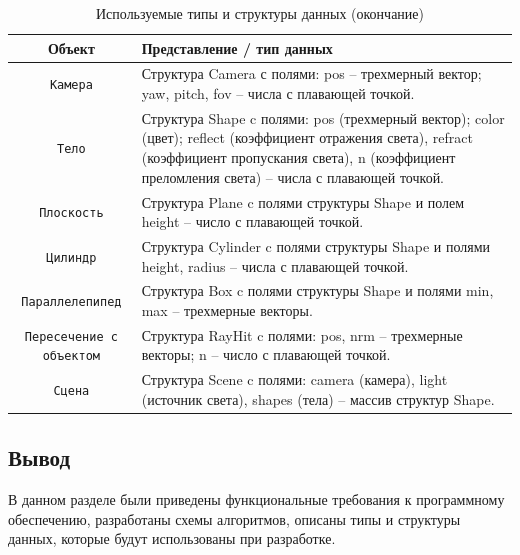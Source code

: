 \newpage
\setcounter{table}{2}
\begin{table}[ht!]
	\centering{}	
	\caption{Используемые типы и структуры данных (окончание)}
	\begin{tabular}{|c|>{\arraybackslash}p{10.5cm}|} \hline
		\textbf{Объект} & \textbf{Представление / тип данных} \\
		\hline\hline
		
		\texttt{Камера} & Структура Camera с полями: pos -- трехмерный вектор; yaw, pitch, fov -- числа с плавающей точкой. \\ \hline
	
		\texttt{Тело} & Структура Shape c полями: pos (трехмерный вектор); color (цвет); reflect (коэффициент отражения света), refract (коэффициент пропускания света), n (коэффициент преломления света) -- числа с плавающей точкой. \\ \hline
		
		\texttt{Плоскость} & Структура Plane c полями структуры Shape и полем height -- число с плавающей точкой.\\ \hline
		
		\texttt{Цилиндр} & Структура Cylinder c полями структуры Shape и полями height, radius -- числа с плавающей точкой.\\ \hline
		
		\texttt{Параллелепипед} & Структура Box c полями структуры Shape и полями min, max -- трехмерные векторы.\\ \hline
		
		\texttt{Пересечение с объектом} & Структура RayHit c полями: pos, nrm -- трехмерные векторы; n -- число с плавающей точкой. \\ \hline
		
		\texttt{Сцена} & Структура Scene c полями: camera (камера), light (источник света), shapes (тела) -- массив структур Shape. \\ \hline
	\end{tabular}
\end{table}
	
\subsection*{Вывод}

В данном разделе были приведены функциональные требования к программному обеспечению, разработаны схемы алгоритмов, описаны типы и структуры данных, которые будут использованы при разработке.


